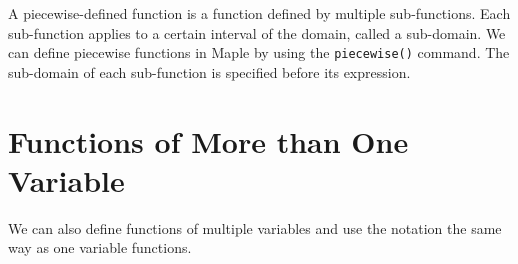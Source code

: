 A piecewise-defined function is a function defined by multiple sub-functions. Each sub-function applies to a certain interval of the domain, called a sub-domain. We can define piecewise functions in Maple by using the \texttt{piecewise()} command. The sub-domain of each sub-function is specified before its expression.


\begin{maplegroup}
\begin{mapleinput}
\end{mapleinput}
\mapleresult
\begin{maplelatex}
\end{maplelatex}
\end{maplegroup}

\begin{maplegroup}
\begin{mapleinput}
\end{mapleinput}
\mapleresult
\begin{maplelatex}
\end{maplelatex}
\end{maplegroup}

\section{Functions of More than One Variable}

We can also define functions of multiple variables and use the notation the same way as one variable functions.


